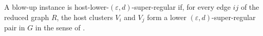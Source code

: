\begin{definition}
A blow-up instance  is host-lower-$(\varepsilon,d)$-super-regular if, for every edge $ij$ of the reduced graph $R$, the host clusters $V_i$ and $V_j$ form a lower $(\varepsilon,d)$-super-regular pair in $G$ in the sense of .
\end{definition}
